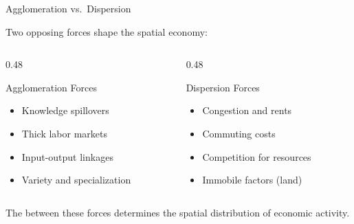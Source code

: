 \documentclass{beamer}
\begin{document}
\begin{frame}{Agglomeration vs.\ Dispersion}

    Two opposing forces shape the spatial economy:

    \vspace{0.5em}
    \begin{columns}[T]
        \begin{column}{0.48\textwidth}
            \begin{block}{Agglomeration Forces}
                \begin{itemize}
                    \item Knowledge spillovers
                    \item Thick labor markets
                    \item Input-output linkages
                    \item Variety and specialization
                \end{itemize}
            \end{block}
        \end{column}
        \begin{column}{0.48\textwidth}
            \begin{block}{Dispersion Forces}
                \begin{itemize}
                    \item Congestion and rents
                    \item Commuting costs
                    \item Competition for resources
                    \item Immobile factors (land)
                \end{itemize}
            \end{block}
        \end{column}
    \end{columns}

    \vspace{0.5em}
    The  between these forces determines the spatial distribution of economic activity.

\end{frame}
\end{document}
